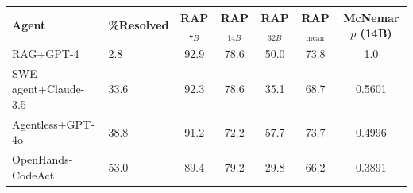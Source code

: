 \begin{tabular}{llccccc}
\toprule
Agent & \%Resolved & RAP$_{7B}$ & RAP$_{14B}$ & RAP$_{32B}$ & RAP$_\text{mean}$ & McNemar $p$ (14B) \\
\midrule
RAG+GPT-4 & 2.8 & 92.9 & 78.6 & 50.0 & 73.8 & 1.0 \\
SWE-agent+Claude-3.5 & 33.6 & 92.3 & 78.6 & 35.1 & 68.7 & 0.5601 \\
Agentless+GPT-4o & 38.8 & 91.2 & 72.2 & 57.7 & 73.7 & 0.4996 \\
OpenHands-CodeAct & 53.0 & 89.4 & 79.2 & 29.8 & 66.2 & 0.3891 \\
\bottomrule
\end{tabular}
